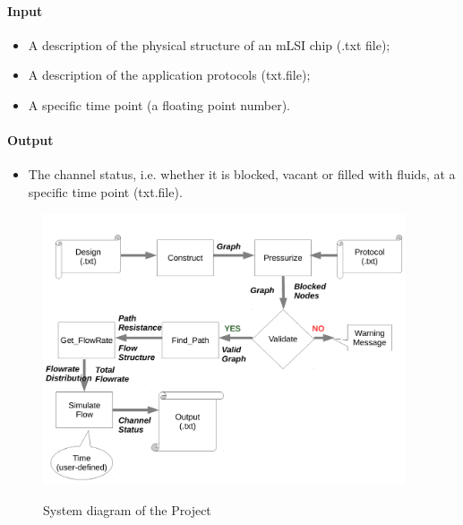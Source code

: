 \documentclass{article}
\begin{document}
\paragraph{Input}
\begin{itemize}
\item A description of the physical structure of an mLSI chip (.txt file);
\item A description of the application protocols (txt.file);
\item A specific time point (a floating point number).
\end{itemize}
\paragraph{Output}
\begin{itemize}
\item The channel status, i.e. whether it is blocked, vacant or filled with fluids, at a specific time point (txt.file).
\end{itemize}

\begin{figure}
\caption{System diagram of the Project}
\includegraphics[height = 8cm]{systemdiagram}
\label{fig:system}
\end{figure}
\end{document}
